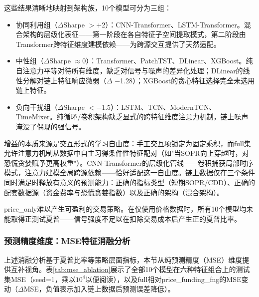\documentclass[12pt,a4paper]{ctexart}
\begin{document}
这些结果清晰地映射到架构族，10个模型可分为三组：

\begin{itemize}[leftmargin=2.5em]
    \item 协同利用组（$\Delta$Sharpe $> +2$）：CNN-Transformer、LSTM-Transformer。混合架构的层级化表征——第一阶段在各自特征子空间提取模式，第二阶段由Transformer跨特征维度建模依赖——为跨源交互提供了天然适配。
    \item 中性组（$\Delta$Sharpe $\approx 0$）：Transformer、PatchTST、DLinear、XGBoost。纯自注意力平等对待所有维度，缺乏对信号与噪声的差异化处理；DLinear的线性分解对链上特征响应微弱（$\Delta$ $-$1.28）；XGBoost的贪心特征选择完全未选用链上特征。
    \item 负向干扰组（$\Delta$Sharpe $< -1.5$）：LSTM、TCN、ModernTCN、TimeMixer。纯循环/卷积架构缺乏显式的跨特征维度注意力机制，链上噪声淹没了偶现的强信号。
\end{itemize}

增益的本质来源是交互形式的学习自由度：手工交互项锁定为固定乘积，而full集允许注意力机制从数据中自主习得条件性特征配对（如"当SOPR向上穿越时，对恐慌贪婪赋予更高权重"）。CNN-Transformer的层级化管线——卷积捕获局部时序模式，注意力建模全局跨源依赖——恰好适配这一自由度。链上数据仅在三个条件同时满足时释放有意义的预测能力：正确的指标类型（短期SOPR/CDD）、正确的配套数据源（资金费率与恐慌贪婪指数）以及正确的架构（混合架构）。

price\_only难以产生可盈利的交易策略。在仅使用价格数据时，所有10个模型均未能取得正测试夏普——信号强度不足以在扣除交易成本后产生正的夏普比率。

\subsubsection{预测精度维度：MSE特征消融分析}

上述消融分析基于夏普比率等策略层面指标，本节从纯预测精度（MSE）维度提供互补视角。表\ref{tab:mse_ablation}展示了全部10个模型在六种特征组合上的测试集MSE（seed=1，乘以$10^{4}$以便阅读），以及full相对price\_funding\_fng的MSE变动（$\Delta$MSE，负值表示加入链上数据后预测误差降低）。
\end{document}
